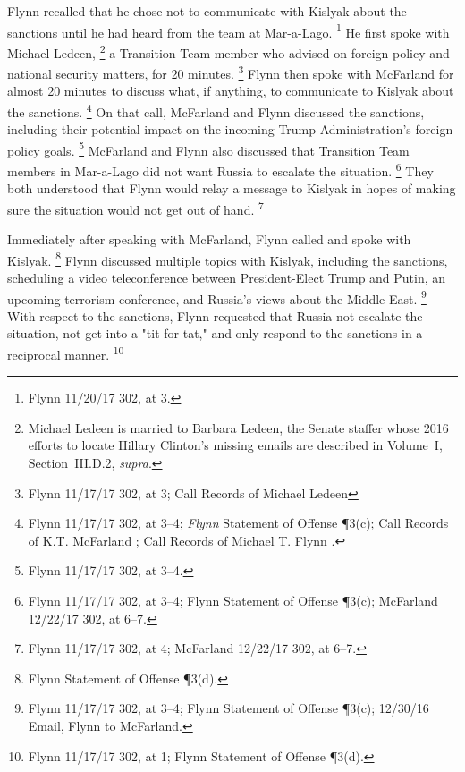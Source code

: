 Flynn recalled that he chose not to communicate with Kislyak about the sanctions until he had heard from the team at Mar-a-Lago.%
\footnote{Flynn 11/20/17 302, at 3.}
He first spoke with Michael Ledeen,%
\footnote{Michael Ledeen is married to Barbara Ledeen, the Senate staffer whose 2016 efforts to locate Hillary Clinton's missing emails are described in Volume~I, Section~III.D.2, \textit{supra}.}
a Transition Team member who advised on foreign policy and national security matters, for 20 minutes.%
\footnote{Flynn 11/17/17 302, at 3;
Call Records of Michael Ledeen }
Flynn then spoke with McFarland for almost 20 minutes to discuss what, if anything, to communicate to Kislyak about the sanctions.%
\footnote{Flynn 11/17/17 302, at 3--4;
\textit{Flynn} Statement of Offense \P 3(c);
Call Records of K.T. McFarland ;
Call Records of Michael T. Flynn .
}
On that call, McFarland and Flynn discussed the sanctions, including their potential impact on the incoming Trump Administration's foreign policy goals.%
\footnote{Flynn 11/17/17 302, at 3--4.}
McFarland and Flynn also discussed that Transition Team members in Mar-a-Lago did not want Russia to escalate the situation.%
\footnote{Flynn 11/17/17 302, at 3--4;
Flynn Statement of Offense \P 3(c);
McFarland 12/22/17 302, at 6--7.}
They both understood that Flynn would relay a message to Kislyak in hopes of making sure the situation would not get out of hand.%
\footnote{Flynn 11/17/17 302, at 4;
McFarland 12/22/17 302, at 6--7.}

Immediately after speaking with McFarland, Flynn called and spoke with Kislyak.%
\footnote{Flynn Statement of Offense \P 3(d).}
Flynn discussed multiple topics with Kislyak, including the sanctions, scheduling a video teleconference between President-Elect Trump and Putin, an upcoming terrorism conference, and Russia's views about the Middle East.%
\footnote{Flynn 11/17/17 302, at 3--4;
Flynn Statement of Offense \P 3(c);
12/30/16 Email, Flynn to McFarland.}
With respect to the sanctions, Flynn requested that Russia not escalate the situation, not get into a "tit for tat," and only respond to the sanctions in a reciprocal manner.%
\footnote{Flynn 11/17/17 302, at 1;
Flynn Statement of Offense \P 3(d).}


